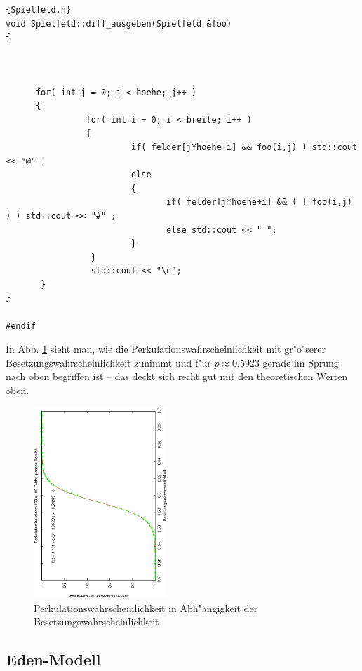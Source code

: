 \documentclass[a4paper]{book}
\begin{document}
\begin{lstlisting}[caption=Spielfeld.h,label=spielfeld]{Spielfeld.h}
void Spielfeld::diff_ausgeben(Spielfeld &foo)
{



      for( int j = 0; j < hoehe; j++ )
      {                          
                for( int i = 0; i < breite; i++ )
                {
                         if( felder[j*hoehe+i] && foo(i,j) ) std::cout << "@" ;
                         else
                         {
                                if( felder[j*hoehe+i] && ( ! foo(i,j) ) ) std::cout << "#" ;
                                else std::cout << " ";
                         }
                 }
                 std::cout << "\n";
       }
}

#endif
\end{lstlisting}



In Abb. \ref{fig:schwelle-perk} sieht man, wie die
Perkulationswahrscheinlichkeit mit gr"o"serer
Besetzungswahrscheinlichkeit zunimmt und f"ur $p \approx 0.5923$
gerade im Sprung nach oben begriffen ist -- das deckt sich recht gut
mit den theoretischen Werten oben.

\begin{figure}
  \centering
  \includegraphics[angle=-90,width=0.45\textwidth]{bilder/schwelle-2}
  \caption{Perkulationswahrscheinlichkeit in Abh"angigkeit der Besetzungswahrscheinlichkeit}
  \label{fig:schwelle-perk}
\end{figure}





\subsection{Eden-Modell}
\label{sec:eden_modell}
\end{document}

